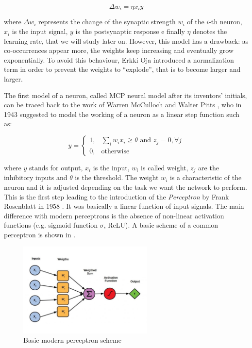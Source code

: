 \documentclass[12pt,a4paper]{report}
\theoremstyle{definition}
\begin{document}
\begin{equation}
    \Delta w_i = \eta x_i y
\label{eq:Hebbian rule}
\end{equation}

where $\Delta w_i$ represents the change of the synaptic strength $w_i$ of the $i$-th neuron, $x_i$ is the input signal, $y$ is the postsynaptic response e finally $\eta$ denotes the learning rate, that we will study later on. However, this model has a drawback: as co-occurrences appear more, the weights keep increasing and eventually grow exponentially.
To avoid this behaviour, Erkki Oja \cite{Oja} introduced a normalization term in order to prevent the weights to ``explode'', that is to become larger and larger.

The first model of a neuron, called MCP neural model after its inventors' initials, can be traced back to the work of Warren McCulloch and Walter Pitts \cite{MCP}, who in 1943 suggested to model the working of a neuron as a linear step function such as:

\begin{equation}
    y=
    \begin{cases}
    1,& \sum_i w_i x_i \geq \theta  \text{ and }  z_j=0,\forall j \\
    0,& \text{otherwise}
    \end{cases}
\label{eq:MCP}
\end{equation}

where $y$ stands for output, $x_i$ is the input, $w_i$ is called weight, $z_j$ are the inhibitory inputs and $\theta$ is the threshold. The weight $w_i$ is a characteristic of the neuron and it is adjusted depending on the task we want the network to perform. This is the first step leading to the introduction of the \emph{Perceptron} by Frank Rosenblatt in 1958 \cite{Rosenblatt}. It was basically a linear function of input signals. The main difference with modern perceptrons is the absence of non-linear activation functions (e.g. sigmoid function $\sigma$, ReLU). A basic scheme of a common perceptron is shown in .

\begin{figure}
    \centering
    \includegraphics[width=0.6\textwidth]{./Images/perceptron.pdf}
    \caption{Basic modern perceptron scheme}
    \label{fig:perceptron}
\end{figure}
\end{document}
